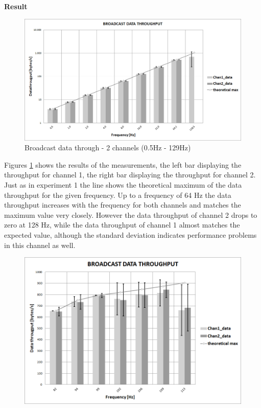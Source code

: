 \begin{description}
	\item{\textbf{Result}} \hfill \\  	
	\begin{figure}[H]
		\centering
		\includegraphics[scale=0.5]{content/images/exp2_norm.png}
		\caption{Broadcast data through - 2 channels (0.5Hz - 129Hz)}\label{fig:exp2low}
	\end{figure}
	Figures \ref{fig:exp2low} shows the results of the measurements, the left bar displaying the throughput for channel 1, the right bar displaying the throughput for channel 2. Just as in experiment 1 the  line shows the theoretical maximum of the data throughput for the given frequency. Up to a frequency of 64 Hz the data throughput increases with the frequency for both channels and matches the maximum value very closely. However the data throughput of channel 2  drops to zero at 128 Hz, while the data throughput of channel 1 almost matches the expected value, although the standard deviation indicates performance problems in this channel as well.
		\begin{figure}[H]
			\centering
			\includegraphics[scale=0.5]{content/images/exp2_detail.png}

\end{figure}
\end{description}
